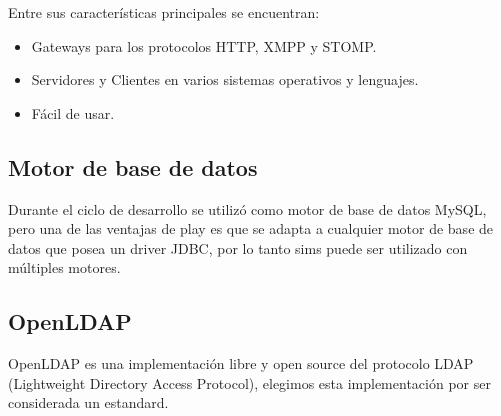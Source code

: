 Entre sus características principales se encuentran:

\begin{itemize}
\item Gateways para los protocolos HTTP, XMPP y STOMP.
\item Servidores y Clientes en varios sistemas operativos y lenguajes.
\item Fácil de usar.
\end{itemize}
 
\subsection{Motor de base de datos}

Durante el ciclo de desarrollo se utilizó como motor de base de datos MySQL, pero una de las ventajas de play es que se adapta a cualquier motor de
base de datos que posea un driver JDBC, por lo tanto sims puede ser utilizado con múltiples motores.

\subsection{OpenLDAP}

OpenLDAP es una implementación libre y open source del protocolo LDAP (Lightweight Directory Access Protocol), elegimos esta implementación por ser considerada un estandard.





